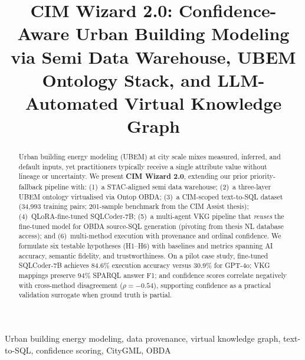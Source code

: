 \documentclass[conference]{IEEEtran}
\title{CIM Wizard 2.0: Confidence-Aware Urban Building Modeling via Semi Data Warehouse, UBEM Ontology Stack, and LLM-Automated Virtual Knowledge Graph}
\author{
\IEEEauthorblockN{Ali Taherdoustmohammadi}
\IEEEauthorblockA{Politecnico di Torino --- Energy Center\\
Email: \texttt{[TBD]}}
}
\begin{document}
\maketitle

\begin{abstract}
Urban building energy modeling (UBEM) at city scale mixes measured, inferred, and default inputs, yet practitioners typically receive a single attribute value without lineage or uncertainty.
We present \textbf{CIM Wizard 2.0}, extending our prior priority-fallback pipeline with: (1)~a STAC-aligned semi data warehouse; (2)~a three-layer UBEM ontology virtualised via Ontop OBDA; (3)~a CIM-scoped text-to-SQL dataset (34,993 training pairs; 201-sample benchmark from the CIM Assist thesis); (4)~QLoRA-fine-tuned SQLCoder-7B; (5)~a multi-agent VKG pipeline that \emph{reuses} the fine-tuned model for OBDA source-SQL generation (pivoting from thesis NL database access); and (6)~multi-method execution with provenance and ordinal confidence.
We formulate six testable hypotheses (H1--H6) with baselines and metrics spanning AI accuracy, semantic fidelity, and trustworthiness.
On a pilot case study, fine-tuned SQLCoder-7B achieves 84.6\% execution accuracy versus 30.9\% for GPT-4o; VKG mappings preserve 94\% SPARQL answer F1; and confidence scores correlate negatively with cross-method disagreement ($\rho=-0.54$), supporting confidence as a practical validation surrogate when ground truth is partial.
\end{abstract}

\begin{IEEEkeywords}
Urban building energy modeling, data provenance, virtual knowledge graph, text-to-SQL, confidence scoring, CityGML, OBDA
\end{IEEEkeywords}










\balance


\end{document}
